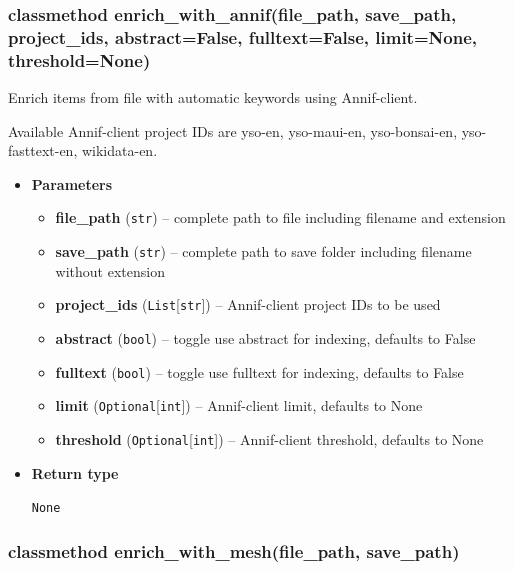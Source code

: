 \hypertarget{classmethod-enrich_with_anniffile_path-save_path-project_ids-abstractfalse-fulltextfalse-limitnone-thresholdnone}{%
\subsubsection{classmethod enrich\_with\_annif(file\_path, save\_path,
project\_ids, abstract=False, fulltext=False, limit=None,
threshold=None)}\label{classmethod-enrich_with_anniffile_path-save_path-project_ids-abstractfalse-fulltextfalse-limitnone-thresholdnone}}

Enrich items from file with automatic keywords using Annif-client.

Available Annif-client project IDs are yso-en, yso-maui-en,
yso-bonsai-en, yso-fasttext-en, wikidata-en.

\begin{itemize}
\item
  \textbf{Parameters}

  \begin{itemize}
  \item
    \textbf{file\_path} (\texttt{str}) -- complete path to file
    including filename and extension
  \item
    \textbf{save\_path} (\texttt{str}) -- complete path to save folder
    including filename without extension
  \item
    \textbf{project\_ids} (\texttt{List}{[}\texttt{str}{]}) --
    Annif-client project IDs to be used
  \item
    \textbf{abstract} (\texttt{bool}) -- toggle use abstract for
    indexing, defaults to False
  \item
    \textbf{fulltext} (\texttt{bool}) -- toggle use fulltext for
    indexing, defaults to False
  \item
    \textbf{limit} (\texttt{Optional}{[}\texttt{int}{]}) -- Annif-client
    limit, defaults to None
  \item
    \textbf{threshold} (\texttt{Optional}{[}\texttt{int}{]}) --
    Annif-client threshold, defaults to None
  \end{itemize}
\item
  \textbf{Return type}

  \texttt{None}
\end{itemize}

\hypertarget{classmethod-enrich_with_meshfile_path-save_path}{%
\subsubsection{classmethod enrich\_with\_mesh(file\_path,
save\_path)}\label{classmethod-enrich_with_meshfile_path-save_path}}

